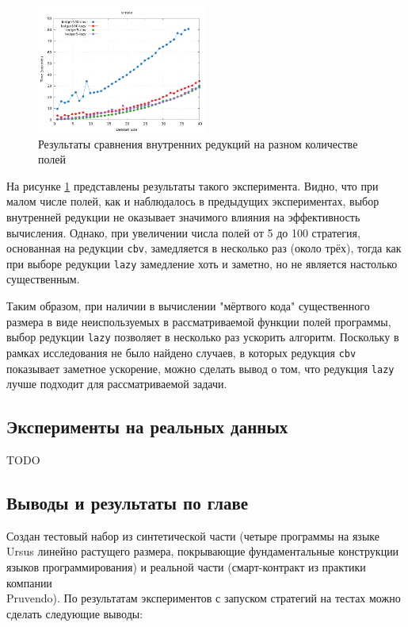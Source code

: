 \documentclass[../thesis.tex]{subfiles}
\begin{document}
\begin{figure}
    \centering
    \includegraphics[width=0.5\textwidth]{ledger_size.png} 
    \caption{Результаты сравнения внутренних редукций на разном количестве полей}
    \label{ledger_size}
\end{figure}
На рисунке \ref{ledger_size} представлены результаты такого эксперимента. Видно, что при малом числе полей, как и наблюдалось в предыдущих экспериментах, выбор внутренней редукции не оказывает значимого влияния на эффективность вычисления. Однако, при увеличении числа полей от 5 до 100 стратегия, основанная на редукции \texttt{cbv}, замедляется в несколько раз (около трёх), тогда как при выборе редукции \texttt{lazy} замедление хоть и заметно, но не является настолько существенным. 

Таким образом, при наличии в вычислении "мёртвого кода" существенного размера в виде неиспользуемых в рассматриваемой функции полей программы, выбор редукции \texttt{lazy} позволяет в несколько раз ускорить алгоритм. Поскольку в рамках исследования не было найдено случаев, в которых редукция \texttt{cbv} показывает заметное ускорение, можно сделать вывод о том, что редукция \texttt{lazy} лучше подходит для рассматриваемой задачи. 

\subsection{Эксперименты на реальных данных}

TODO

\subsection{Выводы и результаты по главе}

Создан тестовый набор из синтетической части (четыре программы на языке Ursus линейно растущего размера, покрывающие фундаментальные конструкции языков программирования) и реальной части (смарт-контракт из практики компании\\Pruvendo). По результатам экспериментов с запуском стратегий на тестах можно сделать следующие выводы:
\end{document}
